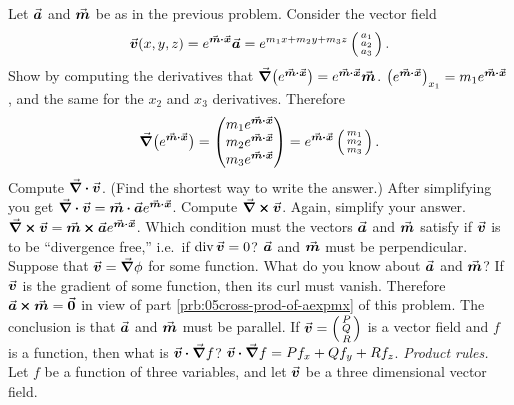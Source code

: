 \documentclass{amsart}
\begin{document}
\problem \label{prb:05derivs-of-a-exp-of-mx} %
Let $\va$ and $\vm$ be as in the previous problem.
Consider the vector field
\[
\vv(x, y, z) = e^{\vm\dpp\vx}\va = e^{m_1x+m_2y+m_3z}\tvek a_1\\a_2\\a_3\ttor.
\]
\subprob Show by computing the derivatives %
that $\nab \bigl(e^{\vm\dpp\vx}\bigr) = e^{\vm\dpp\vx} \vm$.
\answer
$\bigl(e^{\vm\dpp\vx}\bigr)_{x_1} = m_1e^{\vm\dpp\vx}$, and the same for the $x_2$
and $x_3$ derivatives.  Therefore
\[
\nab\bigl(e^{\vm\dpp\vx}\bigr) =
\vek m_1e^{\vm\dpp\vx}\\m_2e^{\vm\dpp\vx} \\ m_3e^{\vm\dpp\vx} \tor
=e^{\vm\dpp\vx} \tvek m_1\\m_2\\m_3\ttor.
\]
\endanswer
\subprob Compute $\nab\dpp \vv$.  (Find the shortest way to write %
the answer.)
\answer
After simplifying you get $\nab\dpp\vv = \vm\dpp\va e^{\vm\dpp\vx}$.
\endanswer
\subprob Compute $\nab\cp\vv$.\label{prb:05cross-prod-of-aexpmx} %
Again, simplify your answer.
\answer
$\nab\cp\vv = \vm\cp\va e^{\vm\dpp\vx}$.
\endanswer
\subprob Which condition must the vectors $\va$ and $\vm$ satisfy if  %
$\vv$ is to be ``divergence free,'' i.e.\ if $\div \vv = 0$?
\answer
$\va$ and $\vm$ must be perpendicular.
\endanswer
\subprob Suppose that $\vv = \nab \phi$ for some function. %
What do you know about $\va$ and $\vm$?
\answer
If $\vv$ is the gradient of some function, then its curl must vanish.
Therefore $\va\cp\vm=\vvv0$ in view of part \ref{prb:05cross-prod-of-aexpmx}
of this problem.  The conclusion is that $\va$ and $\vm$ must
be parallel.
\endanswer
\problem If $\vv=\tvek P\\ Q \\ R\ttor$ is a vector field and $f$ is %
a function, then what is $\vv\dpp\nab f$?
\answer
$\vv\dpp\nab f = P f_x + Q f_y + R f_z$.
\endanswer
\problem \emph{Product rules. }\label{prb:05product-rule} %
Let $f$ be a function of three variables, and let $\vv$ be a three
dimensional vector field.
\end{document}

